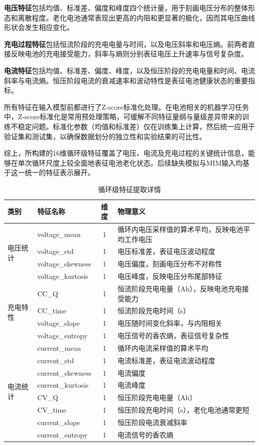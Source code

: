 \documentclass[10pt,a4paper]{ctexart}
\begin{document}
\textbf{电压特征}包括均值、标准差、偏度和峰度四个统计量，用于刻画电压分布的整体形态和离散程度。老化电池通常表现出更高的内阻和更显著的极化，因而其电压曲线形状会发生相应变化。

\textbf{充电过程特征}包括恒流阶段的充电电量与时间，以及电压斜率和电压熵。前两者直接反映电池的充电接受能力，斜率与熵则分别表征电压上升速率与信号复杂度。

\textbf{电流特征}包括均值、标准差、偏度、峰度，以及恒压阶段的充电电量和时间、电流斜率与电流熵。恒压阶段电流的衰减速率和波动特性是表征电池健康状态的重要指标。

所有特征在输入模型前都进行了Z-score标准化处理。在电池相关的机器学习任务中，Z-score标准化是常用预处理策略，可缓解不同特征量纲与量级差异带来的训练不稳定问题\cite{xue2024batteryml}。标准化参数（均值和标准差）仅在训练集上计算，然后统一应用于验证集和测试集，以确保数据划分的独立性和实验结果的可比性。

综上，所构建的16维循环级特征覆盖了电压、电流及充电过程的关键统计信息，能够在单次循环尺度上较全面地表征电池老化状态。后续缺失模拟与MIM输入均基于这一统一的特征表示展开。

\begin{table}[H]
\centering
\caption{循环级特征提取详情}
\label{tab:features}
\begin{tabular}{@{}llcp{6cm}@{}}
\toprule
\textbf{类别} & \textbf{特征名称} & \textbf{维度} & \textbf{物理意义} \\
\midrule
\multirow{4}{*}{电压统计} 
& voltage\_mean & 1 & 循环内电压采样值的算术平均，反映电池平均工作电压 \\
& voltage\_std & 1 & 电压标准差，表征电压波动程度 \\
& voltage\_skewness & 1 & 电压偏度，刻画电压分布不对称性 \\
& voltage\_kurtosis & 1 & 电压峰度，反映电压分布尾部特征 \\
\midrule
\multirow{4}{*}{充电特性} 
& CC\_Q & 1 & 恒流阶段充电电量（Ah），反映电池充电接受能力 \\
& CC\_time & 1 & 恒流阶段充电时间（s） \\
& voltage\_slope & 1 & 电压随时间变化斜率，与内阻相关 \\
& voltage\_entropy & 1 & 电压信号的香农熵，表征信号复杂性 \\
\midrule
\multirow{8}{*}{电流统计} 
& current\_mean & 1 & 循环内电流采样值的算术平均 \\
& current\_std & 1 & 电流标准差，表征电流波动程度 \\
& current\_skewness & 1 & 电流偏度 \\
& current\_kurtosis & 1 & 电流峰度 \\
& CV\_Q & 1 & 恒压阶段充电电量（Ah） \\
& CV\_time & 1 & 恒压阶段充电时间（s），老化电池通常更短 \\
& current\_slope & 1 & 恒压阶段电流衰减斜率 \\
& current\_entropy & 1 & 电流信号的香农熵 \\
\bottomrule
\end{tabular}
\end{table}
\end{document}
